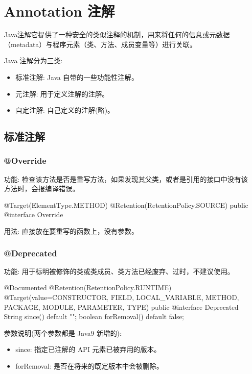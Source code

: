 \section{Annotation 注解}

Java注解它提供了一种安全的类似注释的机制，用来将任何的信息或元数据（metadata）与程序元素（类、方法、成员变量等）进行关联。

Java 注解分为三类:
\begin{itemize}
    \item 标准注解: Java 自带的一些功能性注解。
    \item 元注解: 用于定义注解的注解。
    \item 自定注解: 自己定义的注解(略)。
\end{itemize}

\subsection{标准注解}

\subsubsection{@Override}

功能: 检查该方法是否是重写方法，如果发现其父类，或者是引用的接口中没有该方法时，会报编译错误。

\begin{Java}
@Target(ElementType.METHOD)
@Retention(RetentionPolicy.SOURCE)
public @interface Override {}
\end{Java}

用法: 直接放在要重写的函数上，没有参数。

\subsubsection{@Deprecated}

功能: 用于标明被修饰的类或类成员、类方法已经废弃、过时，不建议使用。

\begin{Java}
@Documented
@Retention(RetentionPolicy.RUNTIME)
@Target(value={CONSTRUCTOR, FIELD, LOCAL_VARIABLE, METHOD, PACKAGE, MODULE, PARAMETER, TYPE})
public @interface Deprecated {
    String since() default "";
    boolean forRemoval() default false;
}
\end{Java}

参数说明(两个参数都是 Java9 新增的):
\begin{itemize}
    \item since: 指定已注解的 API 元素已被弃用的版本。
    \item forRemoval: 是否在将来的既定版本中会被删除。
\end{itemize}

